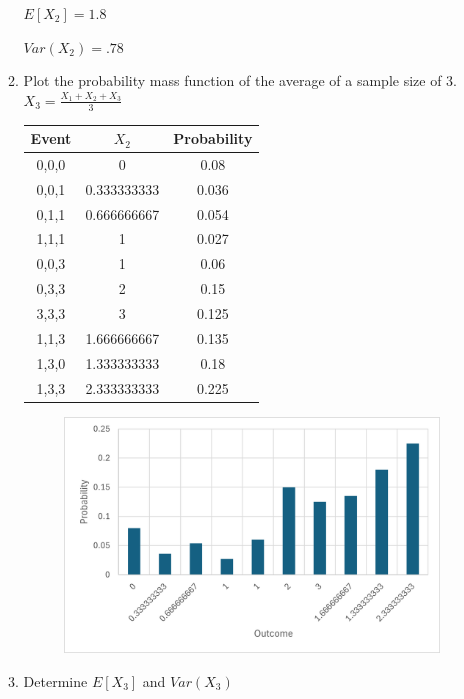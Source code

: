 \documentclass{article}
\begin{document}
\begin{enumerate}
\begin{enumerate}
        $\displaystyle E[X_2] = 1.8$

        $\displaystyle Var(X_2) = .78$

        \item Plot the probability mass function of the average of a sample size of 3. $X_3 = \frac{X_1+X_2+X_3}{3}$
        
        \begin{tabular}{|c|c|c|}
            \hline
            \textbf{Event} & \bf{$X_2$} & \textbf{Probability} \\
            \hline
            0,0,0 & 0 & 0.08 \\
            0,0,1 & 0.333333333 & 0.036 \\
            0,1,1 & 0.666666667 & 0.054 \\
            1,1,1 & 1 & 0.027 \\
            0,0,3 & 1 & 0.06 \\
            0,3,3 & 2 & 0.15 \\
            3,3,3 & 3 & 0.125 \\
            1,1,3 & 1.666666667 & 0.135 \\
            1,3,0 & 1.333333333 & 0.18 \\
            1,3,3 & 2.333333333 & 0.225 \\
            \hline
            \end{tabular}
        
            \begin{figure}[!htbp]
                \centerline{\includegraphics[keepaspectratio]{Picture/Picture2.png}}
                \label{fig1}
            \end{figure}
        \item Determine $E[X_3]$ and $Var(X_3)$
        

\end{enumerate}
\end{enumerate}
\end{document}
